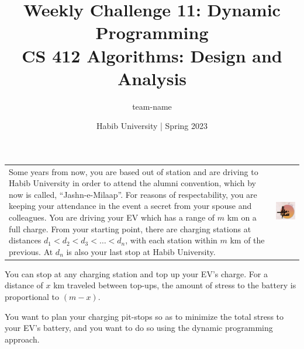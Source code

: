 \documentclass[a4paper]{exam}
\title{Weekly Challenge 11: Dynamic Programming\\CS 412 Algorithms: Design and Analysis}
\author{team-name}  %
\date{Habib University | Spring 2023}
\begin{document}
\maketitle

\begin{questions}

  

  \begin{tabularx}{\linewidth}{Xr}
    Some years from now, you are based out of station and are driving to Habib University in order to attend the alumni convention, which by now is called, ``Jashn-e-Milaap''. For reasons of respectability, you are keeping your attendance in the event a secret from your spouse and colleagues. You are driving your EV which has a range of $m$ km on a full charge. From your starting point, there are charging stations at distances $d_1 < d_2 < d_3 <\ldots<d_n$, with each station within $m$ km of the previous. At $d_n$ is also your last stop at Habib University.
    &
    \includegraphics[valign=t,scale=.7]{milaap}\\
  \end{tabularx}

  You can stop at any charging station and top up your EV's charge. For a distance of $x$ km traveled between top-ups, the amount of stress to the battery is proportional to $(m-x)$.

  You want to plan your charging pit-stops so as to minimize the total stress to your EV's battery, and you want to do so using the dynamic programming approach.

\end{questions}
\end{document}
